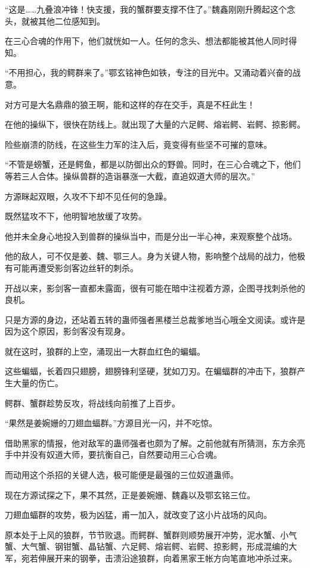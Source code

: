 \begin{this_body}
“这是……九叠浪冲锋！快支援，我的蟹群要支撑不住了。”魏鑫刚刚升腾起这个念头，就被其他二位感知到。

在三心合魂的作用下，他们就恍如一人。任何的念头、想法都能被其他人同时得知。

“不用担心，我的鳄群来了。”鄂玄铭神色如铁，专注的目光中。又涌动着兴奋的战意。

对方可是大名鼎鼎的狼王啊，能和这样的存在交手，真是不枉此生！

在他的操纵下，很快在防线上。就出现了大量的六足鳄、熔岩鳄、岩鳄、掠影鳄。

险些崩溃的防线，在这些生力军的注入后，竟变得有些坚不可摧的意味。

“不管是螃蟹，还是鳄鱼，都是以防御出众的野兽。同时，在三心合魂之下，他们等若三人合体。操纵兽群的造诣暴涨一大截，直追奴道大师的层次。”

方源眯起双眼，久攻不下却不见任何的急躁。

既然猛攻不下，他明智地放缓了攻势。

他并未全身心地投入到兽群的操纵当中，而是分出一半心神，来观察整个战场。

他的敌人，可不仅是姜、魏、鄂三人。身为关键人物，影响整个战局的战力，他极有可能再遭受影剑客边丝轩的刺杀。

开战以来，影剑客一直都未露面，很有可能在暗中注视着方源，企图寻找刺杀他的良机。

只是方源的身边，还站着五转的蛊师强者黑楼兰总裁爹地当心哦全文阅读。或许是因为这个原因，影剑客没有现身。

就在这时，狼群的上空，涌现出一大群血红色的蝙蝠。

这些蝙蝠，长着四只翅膀，翅膀锋利坚硬，犹如刀刃。在蝙蝠群的冲击下，狼群产生大量的伤亡。

鳄群、蟹群趁势反攻，将战线向前推了上百步。

“果然是姜婉姗的刀翅血蝠群。”方源目光一闪，并不吃惊。

借助黑家的情报，他对敌军的蛊师强者也颇为了解。之前他就有所猜测，东方余亮手中并没有奴道大师，要抗衡自己，自然要动用三心合魂。

而动用这个杀招的关键人选，极可能便是最强的三位奴道蛊师。

现在方源试探之下，果不其然，正是姜婉姗、魏鑫以及鄂玄铭三位。

刀翅血蝠群的攻势，极为凶猛，甫一加入，就改变了这小片战场的风向。

原本处于上风的狼群，节节败退。而鳄群、蟹群则顺势展开冲势，泥水蟹、小气蟹、大气蟹、钢钳蟹、晶钻蟹、六足鳄、熔岩鳄、岩鳄、掠影鳄，形成混编的大军，宛若伸展开来的钢拳，击溃沿途狼群，向着黑家王帐方向笔直地冲杀过来。


\end{this_body}
